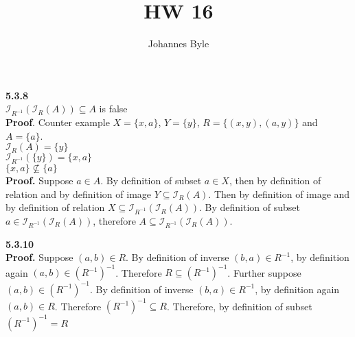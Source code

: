 \documentclass[12pt]{article}
\title{HW 16}
\author{Johannes Byle}
\begin{document}
    \maketitle
    \noindent
    \textbf{5.3.8}\\
    $\mathcal{I}_{R^{-1}}(\mathcal{I}_R(A))\subseteq A$ is false\\
    \textbf{Proof}. Counter example $X=\{x, a\}$, $Y=\{y\}$, $R=\{(x, y), (a, y)\}$ and $A=\{a\}$.\\
    $\mathcal{I}_R(A)=\{y\}$\\
    $\mathcal{I}_{R^{-1}}(\{y\})=\{x, a\}$\\
    $\{x, a\}\nsubseteq\{a\}$\\

    \smallskip
    \noindent
    \textbf{Proof.} Suppose $a\in A$.
    By definition of subset $a\in X$, then by definition of relation and by definition of image
    $Y\subseteq\mathcal{I}_{R}(A)$.
    Then by definition of image and by definition of relation $X\subseteq\mathcal{I}_{R^{-1}}(\mathcal{I}_R(A))$.
    By definition of subset $a\in\mathcal{I}_{R^{-1}}(\mathcal{I}_R(A))$, therefore $A\subseteq \mathcal{I}_{R^{-1}}
    (\mathcal{I}_R(A))$.

    \medskip
    \noindent
    \textbf{5.3.10}\\
    \textbf{Proof.} Suppose $(a, b)\in R$.
    By definition of inverse $(b, a)\in R^{-1}$, by definition again $(a, b)\in (R^{-1})^{-1}$.
    Therefore $R \subseteq (R^{-1})^{-1}$.
    Further suppose $(a, b)\in (R^{-1})^{-1}$.
    By definition of inverse $(b, a)\in R^{-1}$, by definition again $(a, b)\in R$.
    Therefore $(R^{-1})^{-1}\subseteq R$.
    Therefore, by definition of subset $(R^{-1})^{-1}= R$
\end{document}
